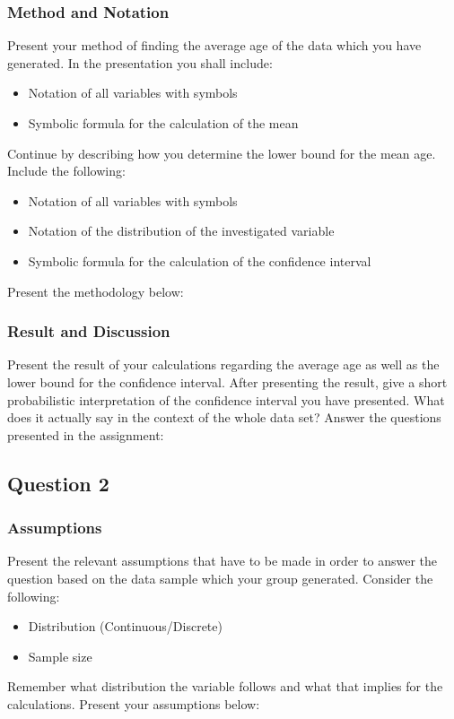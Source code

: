\documentclass[a4paper, 10pt,serif]{article}
\begin{document}
\bigskip
\bigskip
\bigskip
\bigskip

\subsubsection*{Method and Notation}

Present your method of finding the average age of the data which you have generated.
In the presentation you shall include:
\begin{itemize}
    \item Notation of all variables with symbols
    \item Symbolic formula for the calculation of the mean
\end{itemize}
Continue by describing how you determine the lower bound for the mean age. Include the following:
\begin{itemize}
    \item Notation of all variables with symbols
    \item Notation of the distribution of the investigated variable
    \item Symbolic formula for the calculation of the confidence interval
\end{itemize}
Present the methodology below:

\bigskip
\bigskip
\bigskip
\bigskip


\subsubsection*{Result and Discussion}

Present the result of your calculations regarding the average age as well as the lower bound for the confidence interval. After presenting the result, give a short probabilistic interpretation of the confidence interval you have presented. What does it actually say in the context of the whole data set? Answer the questions presented in the assignment:

\newpage
\subsection*{Question 2}

\subsubsection*{Assumptions}

Present the relevant assumptions that have to be made in order to answer the question based on the data sample which your group generated.
Consider the following:
\begin{itemize}
    \item Distribution (Continuous/Discrete)
    \item Sample size
\end{itemize}
Remember what distribution the variable follows and what that implies for the calculations. Present your assumptions below:
\end{document}
